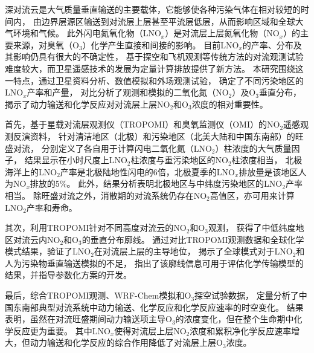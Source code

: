 
\abstract
{
深对流云是大气质量垂直输送的主要载体，它能够使各种污染气体在相对较短的时间内，
由边界层源区输送到对流层上层甚至平流层低层，从而影响区域和全球大气环境和气候。
此外闪电氮氧化物（LNO$_x$）是对流层上层氮氧化物（NO$_x$）的主要来源，对臭氧（O$_3$）化学产生直接和间接的影响。
目前LNO$_x$的产率、分布及其影响仍具有很大的不确定性，
基于探空和飞机观测等传统方法的对流观测试验难度较大，而卫星遥感技术的发展为定量计算排放提供了新方法。
本研究围绕这一特点，通过卫星资料分析、数值模拟和外场观测试验，
确定了不同污染地区的LNO$_x$产率和产量，
对比分析了观测和模拟的二氧化氮（NO$_2$）及O$_3$垂直分布，
揭示了动力输送和化学反应对对流层上层NO$_2$和O$_3$浓度的相对重要性。

首先，基于星载对流层观测仪（TROPOMI）和臭氧监测仪（OMI）的NO$_2$遥感观测反演资料，
针对清洁地区（北极）和污染地区（北美大陆和中国东南部）的旺盛对流，
分别定义了各自用于计算闪电二氧化氮（LNO$_2$）柱浓度的大气质量因子，
结果显示在小时尺度上LNO$_2$柱浓度与重污染地区的NO$_2$柱浓度相当，
北极海洋上的LNO$_2$产率是北极陆地性闪电的6倍，北极夏季的LNO$_x$排放量是该地区人为NO$_x$排放的5\%。
此外，结果分析表明北极地区与中纬度污染地区的LNO$_2$产率相当。
除旺盛对流之外，消散期的对流系统仍存在NO$_2$高值区，亦可用来计算LNO$_2$产率和寿命。

其次，利用TROPOMI针对不同高度对流云的NO$_2$和O$_3$观测，
获得了中低纬度地区对流云内NO$_2$和O$_3$的垂直分布廓线。
通过对比TROPOMI观测数据和全球化学模式结果，验证了LNO$_2$在对流层上层的主导地位，
揭示了全球模式对于LNO$_2$和人为污染物垂直输送模拟的不足，
指出了该廓线信息可用于评估化学传输模型的结果，并指导参数化方案的开发。

最后，综合TROPOMI观测、WRF-Chem模拟和O$_3$探空试验数据，
定量分析了中国东南部典型对流系统中动力输送、化学反应和化学反应速率的时空变化。
结果表明，虽然在对流旺盛期间动力输送项主导O$_3$的浓度变化，但在整个生命期中化学反应更为重要。
其中LNO$_x$使得对流层上层NO$_2$浓度和累积净化学反应速率增大，但动力输送和化学反应的综合作用降低了对流层上层O$_3$浓度。
}
